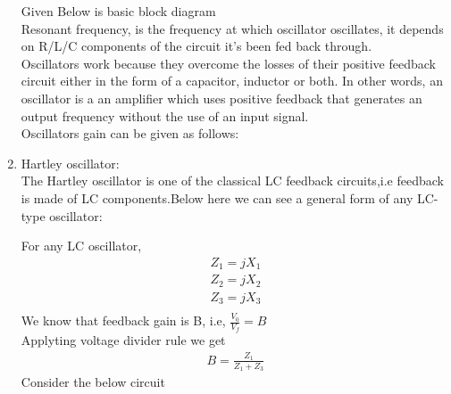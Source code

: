 \begin{enumerate}[label=\thesection.\arabic*.,ref=\thesection.\theenumi]
%		

Given Below is basic block diagram\\
Resonant frequency, is the frequency at which oscillator oscillates, it depends on R/L/C components of the circuit it's been fed back through.\\
Oscillators work because they overcome the losses of their positive feedback circuit either in the form of a capacitor, inductor or both. In other words, an oscillator is a an amplifier which uses positive feedback that generates an output frequency without the use of an input signal.\\
Oscillators gain can be given as follows:\\
\item Hartley oscillator:\\
The Hartley oscillator is one of the classical LC feedback circuits,i.e feedback is made of LC components.Below here we can see a general form of any LC-type oscillator:


For any LC oscillator, 
\begin{align}
    Z_1 = jX_1\\
    Z_2 = jX_2\\
    Z_3 = jX_3\\
\end{align}
We know that feedback gain is B, i.e, $\frac{V_0}{V_f} = B$\\
Applyting voltage divider rule we get
\begin{align}
    B = \frac{Z_1}{Z_1 + Z_3}
\end{align}
Consider the below circuit
\begin{figure}[!ht]
    \begin{center}
		

\end{center}
\end{figure}
\end{enumerate}
